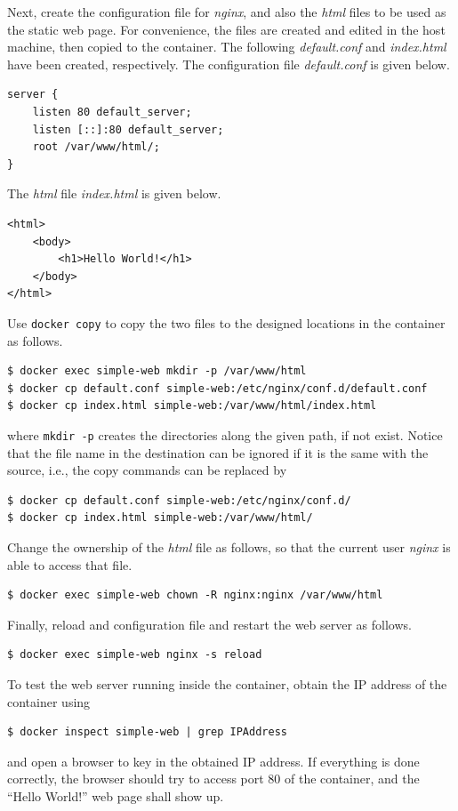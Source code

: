 Next, create the configuration file for \textit{nginx}, and also the \textit{html} files to be used as the static web page. For convenience, the files are created and edited in the host machine, then copied to the container. The following \textit{default.conf} and \textit{index.html} have been created, respectively. The configuration file \textit{default.conf} is given below.
\begin{lstlisting}
server {
	listen 80 default_server;
	listen [::]:80 default_server;
	root /var/www/html/;
}
\end{lstlisting}
The \textit{html} file \textit{index.html} is given below.
\begin{lstlisting}
<html>
	<body>
		<h1>Hello World!</h1>
	</body>
</html>
\end{lstlisting}
Use \verb|docker copy| to copy the two files to the designed locations in the container as follows.
\begin{lstlisting}
$ docker exec simple-web mkdir -p /var/www/html
$ docker cp default.conf simple-web:/etc/nginx/conf.d/default.conf
$ docker cp index.html simple-web:/var/www/html/index.html
\end{lstlisting}
where \verb|mkdir -p| creates the directories along the given path, if not exist. Notice that the file name in the destination can be ignored if it is the same with the source, i.e., the copy commands can be replaced by
\begin{lstlisting}
$ docker cp default.conf simple-web:/etc/nginx/conf.d/
$ docker cp index.html simple-web:/var/www/html/
\end{lstlisting}

Change the ownership of the \textit{html} file as follows, so that the current user \textit{nginx} is able to access that file.
\begin{lstlisting}
$ docker exec simple-web chown -R nginx:nginx /var/www/html
\end{lstlisting}

Finally, reload and configuration file and restart the web server as follows.
\begin{lstlisting}
$ docker exec simple-web nginx -s reload
\end{lstlisting}

To test the web server running inside the container, obtain the IP address of the container using
\begin{lstlisting}
$ docker inspect simple-web | grep IPAddress
\end{lstlisting}
and open a browser to key in the obtained IP address. If everything is done correctly, the browser should try to access port 80 of the container, and the ``Hello World!'' web page shall show up.

